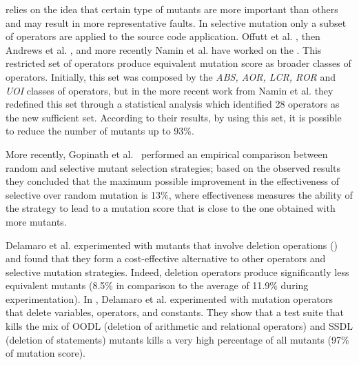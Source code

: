  relies on the idea that certain type of mutants are more important than others and may result in more representative faults. In selective mutation only a subset of operators are applied to the source code application.
Offutt et al. \cite{offutt1996experimental}, then Andrews et al. \cite{andrews2005mutation}, and more recently Namin et al. \cite{siami2008sufficient} have worked on the . This restricted set of operators produce equivalent mutation score as broader classes of operators. Initially, this set was composed by the \textit{ABS, AOR, LCR, ROR} and \textit{UOI} classes of operators, but in the more recent work from Namin et al. \cite{siami2008sufficient} they redefined this set through a statistical analysis which identified 28 operators as the new sufficient set. According to their results, by using this set, it is possible to reduce the number of mutants up to 93\%. 

More recently, Gopinath et al.~\cite{gopinath2016limits} performed an empirical comparison between random and selective mutant selection strategies; based on the observed results they concluded that the maximum possible improvement in the effectiveness of selective over random mutation is 13\%, where effectiveness measures the ability of the strategy to lead to a mutation score that is close to the one obtained with more mutants.

Delamaro et al. \cite{delamaro2014designing,delamaro2014experimental} experimented with mutants that involve deletion operations () and found that they form a cost-effective alternative to other operators and selective mutation strategies. Indeed, deletion operators produce significantly less equivalent mutants (8.5\% in comparison to the average of 11.9\% during experimentation). 
In \cite{delamaro2014experimental}, Delamaro et al. experimented with mutation operators that delete variables, operators, and constants. They show that a test suite that kills the mix of OODL (deletion of arithmetic and relational operators) and SSDL (deletion of statements) mutants kills a very high percentage of all mutants (97\% of mutation score).

